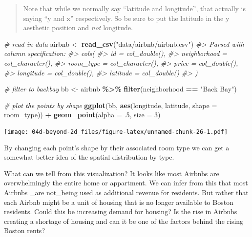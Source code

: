 \documentclass[
]{book}
\newenvironment{Shaded}{\begin{snugshade}}{\end{snugshade}}
\newcommand{\CommentTok}[1]{\textcolor[rgb]{0.56,0.35,0.01}{\textit{#1}}}
\newcommand{\DataTypeTok}[1]{\textcolor[rgb]{0.13,0.29,0.53}{#1}}
\newcommand{\DecValTok}[1]{\textcolor[rgb]{0.00,0.00,0.81}{#1}}
\newcommand{\FloatTok}[1]{\textcolor[rgb]{0.00,0.00,0.81}{#1}}
\newcommand{\KeywordTok}[1]{\textcolor[rgb]{0.13,0.29,0.53}{\textbf{#1}}}
\newcommand{\NormalTok}[1]{#1}
\newcommand{\OperatorTok}[1]{\textcolor[rgb]{0.81,0.36,0.00}{\textbf{#1}}}
\newcommand{\StringTok}[1]{\textcolor[rgb]{0.31,0.60,0.02}{#1}}
\begin{document}
\begin{quote}
Note that while we normally say ``latitude and longitude'', that actually is saying ``y and x'' respectively. So be sure to put the latitude in the y aesthetic position and \emph{not} longitude.
\end{quote}

\begin{Shaded}
\begin{Highlighting}[]
\CommentTok{\# read in data}
\NormalTok{airbnb \textless{}{-}}\StringTok{ }\KeywordTok{read\_csv}\NormalTok{(}\StringTok{"data/airbnb/airbnb.csv"}\NormalTok{)}
\CommentTok{\#\textgreater{} Parsed with column specification:}
\CommentTok{\#\textgreater{} cols(}
\CommentTok{\#\textgreater{}   id = col\_double(),}
\CommentTok{\#\textgreater{}   neighborhood = col\_character(),}
\CommentTok{\#\textgreater{}   room\_type = col\_character(),}
\CommentTok{\#\textgreater{}   price = col\_double(),}
\CommentTok{\#\textgreater{}   longitude = col\_double(),}
\CommentTok{\#\textgreater{}   latitude = col\_double()}
\CommentTok{\#\textgreater{} )}

\CommentTok{\# filter to backbay}
\NormalTok{bb \textless{}{-}}\StringTok{ }\NormalTok{airbnb }\OperatorTok{\%\textgreater{}\%}\StringTok{ }
\StringTok{  }\KeywordTok{filter}\NormalTok{(neighborhood }\OperatorTok{==}\StringTok{ "Back Bay"}\NormalTok{) }

\CommentTok{\# plot the points by shape}
\KeywordTok{ggplot}\NormalTok{(bb,  }\KeywordTok{aes}\NormalTok{(longitude, latitude, }\DataTypeTok{shape =}\NormalTok{ room\_type)) }\OperatorTok{+}\StringTok{ }
\StringTok{  }\KeywordTok{geom\_point}\NormalTok{(}\DataTypeTok{alpha =} \FloatTok{.5}\NormalTok{, }\DataTypeTok{size =} \DecValTok{3}\NormalTok{) }
\end{Highlighting}
\end{Shaded}

\texttt{[image: 04d-beyond-2d\_files/figure-latex/unnamed-chunk-26-1.pdf]}

By changing each point's shape by their associated room type we can get a somewhat better idea of the spatial distribution by type.

What can we tell from this visualization? It looks like most Airbnbs are overwhelmingly the entire home or appartment. We can infer from this that most Airbnbs \_are not\_being used as additional revenue for residents. But rather that each Airbnb might be a unit of housing that is no longer available to Boston residents. Could this be increasing demand for housing? Is the rise in Airbnbs creating a shortage of housing and can it be one of the factors behind the rising Boston rents?
\end{document}
